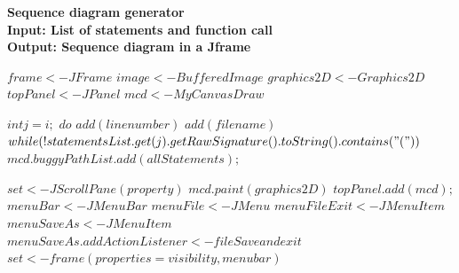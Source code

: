 \begin{algorithm}
	{\textbf{Sequence diagram generator}}\\	
	\noindent\makebox[\linewidth]{\rule{\textwidth}{0.4pt}}
	{\textbf{Input: List of statements and function call}} \\
	{\textbf{Output: Sequence diagram in a Jframe}}
	\begin{algorithmic}[1]
		
		    \State $ frame  <- JFrame  $ 
			\State $ image  <- BufferedImage  $ 
			\State $ graphics2D  <- Graphics2D  $
			\State $ topPanel <- JPanel $
			\State $ mcd <- MyCanvasDraw $
					
					\State $int j=i;$
						\State $do$
						\State $add(line number)$
						\State $add(file name)$
						\State $while(!statementsList.get(j).getRawSignature().toString().contains("("))$
						\State $mcd.buggyPathList.add(allStatements);$ 
					\EndIf				
				\EndIf		
				
			\EndFor
				\State $set <- JScrollPane(property)$
				\State $mcd.paint(graphics2D)$
				\State $topPanel.add(mcd);$	
				\State $menuBar <- JMenuBar$
				\State $menuFile <- JMenu $
				\State $menuFileExit <- JMenuItem$
				\State $menuSaveAs <- JMenuItem $
				\State $menuSaveAs.addActionListener <- fileSave and exit$
				\State $set<-frame (properties=visibility,menubar)$
		
		\EndFunction		
		
	\end{algorithmic}
	\noindent\makebox[\linewidth]{\rule{\textwidth}{0.4pt}}
\end{algorithm}
